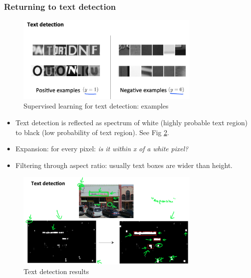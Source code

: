     \subsubsection{Returning to text detection}
    \begin{figure}[htpb]
        \centering
        \includegraphics[width=0.8\textwidth]{image/text-detection-example.png}
        \caption{Supervised learning for text detection: examples}
        \label{fig:text-detection-example}
    \end{figure}


    \begin{itemize}
        \item Text detection is reflected as spectrum of white (highly probable text region) to black (low probability of text region). See Fig \ref{fig:text-detection}.

        \item Expansion: for every pixel: \emph{is it within x of a white pixel?}
        \item Filtering through aspect ratio: usually text boxes are wider than height. 
    \end{itemize}
    
    \begin{figure}[htpb]
        \centering
        \includegraphics[width=0.8\textwidth]{image/text-detection.png}
        \caption{Text detection results}
        \label{fig:text-detection}
    \end{figure}

